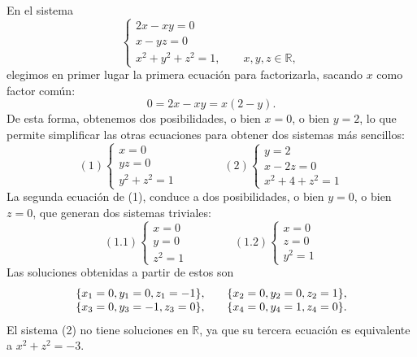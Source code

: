 \begin{ejemplo}
En el sistema
\[
\left\lbrace\begin{array}{l} 2x-xy=0 \\ x-yz=0 \\ x^2+y^2+z^2=1,\qquad
x,y,z\in\mathbb{R},\end{array}\right.
\]
elegimos en primer lugar la primera ecuación para factorizarla, sacando $x$ como factor común:
\[
0=2x-xy=x(2-y).
\]
De esta forma, obtenemos dos posibilidades, o bien $x=0$, o bien $y=2$, lo que permite simplificar las otras ecuaciones para obtener dos sistemas más sencillos:
\[
(1)\left\lbrace\begin{array}{l} x=0 \\ yz=0 \\ y^2+z^2=1 \end{array}\right.
\qquad\qquad
(2)\left\lbrace\begin{array}{l} y=2 \\ x-2z=0 \\ x^2+4+z^2=1 \end{array}\right.
\]
La segunda ecuación de (1), conduce a dos posibilidades, o bien $y=0$, o bien $z=0$, que generan dos sistemas triviales:
\[
(1.{}1)\left\lbrace\begin{array}{l} x=0 \\ y=0 \\ z^2=1 \end{array}\right.
\qquad\qquad
(1.{}2)\left\lbrace\begin{array}{l} x=0 \\ z=0 \\ y^2=1 \end{array}\right.
\]
Las soluciones obtenidas a partir de estos son
\[
\begin{array}{c@{,\qquad}c}
\{x_1=0,y_1=0,z_1=-1\} & 
\{x_2=0,y_2=0,z_2=1\},\\
\{x_3=0,y_3=-1,z_3=0\} &
\{x_4=0,y_4=1,z_4=0\}.
\end{array}
\]
El sistema (2) no tiene soluciones en $\mathbb{R}$, ya que su tercera ecuación es equivalente a
$x^2+z^2=-3$.\fej
\end{ejemplo}
